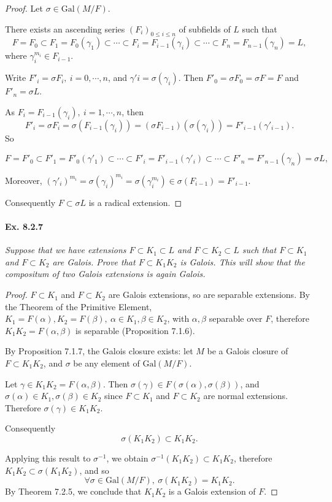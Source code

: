 \documentclass[11pt,a4paper]{article}
\newcommand{\Gal}{\mathrm{Gal}}
\begin{document}
\begin{proof}

Let $\sigma \in \Gal(M/F)$.

There exists an ascending series $(F_i)_{0\leq i \leq n}$ of subfields of $L$ such that
$$F = F_0 \subset F_1=F_0(\gamma_1) \subset \cdots \subset F_i = F_{i-1}(\gamma_i)\subset \cdots \subset F_n = F_{n-1}(\gamma_n)=L,$$
where $\gamma_i^{m_i} \in F_{i-1}$.

Write $F'_i = \sigma F_i,\ i=0,\cdots,n$, and $\gamma'i = \sigma(\gamma_i)$. Then $F'_0 = \sigma F_0 =\sigma F = F$ and $F'_n = \sigma L$.

As $F_i = F_{i-1}(\gamma_i), \ i=1,\cdots,n$, then $$F'_i = \sigma F_i = \sigma(F_{i-1}(\gamma_i)) = (\sigma F_{i-1})(\sigma (\gamma_i)) = F'_{i-1}(\gamma'_{i-1}).$$ So

$$F = F'_0 \subset F'_1=F'_0(\gamma'_1) \subset \cdots \subset F'_i = F'_{i-1}(\gamma'_i)\subset \cdots \subset F'_n = F'_{n-1}(\gamma_n)=\sigma L,$$

Moreover, $(\gamma'_{i})^{m_i} = \sigma(\gamma_i)^{m_i} = \sigma(\gamma_i^{m_i}) \in \sigma(F_{i-1}) = F'_{i-1}$.

Consequently $F \subset \sigma L$ is a radical extension.
\end{proof}

\paragraph{Ex. 8.2.7}

{\it Suppose that we have extensions $F \subset K_1 \subset L$ and $F\subset K_2 \subset L$ such that $F\subset K_1$ and $F \subset K_2$ are Galois. Prove that $F \subset K_1K_2$ is Galois. This will show that the compositum of two Galois extensions is again Galois.
}

\begin{proof}
$F\subset K_1$ and $F \subset K_2$ are Galois extensions, so are separable extensions. By the Theorem of the Primitive Element, $K_1 = F(\alpha), K_2=F(\beta), \ \alpha \in K_1,\beta \in K_2$, with  $\alpha, \beta$ separable over $F$, therefore $K_1K_2 = F(\alpha,\beta)$ is separable (Proposition 7.1.6).

By Proposition 7.1.7, the Galois closure exists: let $M$ be a Galois closure of $F \subset K_1K_2$, and $\sigma$ be any element of $\Gal(M/F)$.


Let  $\gamma \in K_1 K_2 = F(\alpha,\beta)$. Then $\sigma(\gamma)\in F(\sigma(\alpha),\sigma(\beta))$, and $\sigma(\alpha) \in K_1, \sigma(\beta)\in K_2$ since $F\subset K_1$ and $F \subset K_2$ are normal extensions. Therefore $\sigma(\gamma) \in K_1K_2$.
 
Consequently $$\sigma (K_1 K_2) \subset  K_1K_2.$$

Applying this result to $\sigma^{-1}$, we obtain $\sigma^{-1}(K_1K_2) \subset K_1K_2$, therefore $K_1K_2 \subset \sigma(K_1K_2)$, and so
$$\forall \sigma \in \Gal(M/F),\ \sigma (K_1K_2) = K_1 K_2.$$
By Theorem 7.2.5, we conclude that $K_1K_2$ is a Galois extension of $F$.
\end{proof}
\end{document}
